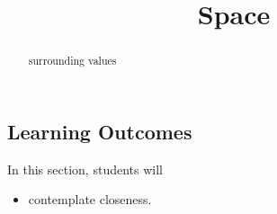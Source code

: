 \documentclass{ximera}
\title{Space}
\begin{document}
\begin{abstract}
surrounding values
\end{abstract}
\maketitle



















\subsection{Learning Outcomes}


\begin{sectionOutcomes}
In this section, students will 

\begin{itemize}
\item contemplate closeness.
\end{itemize}
\end{sectionOutcomes}
\end{document}
